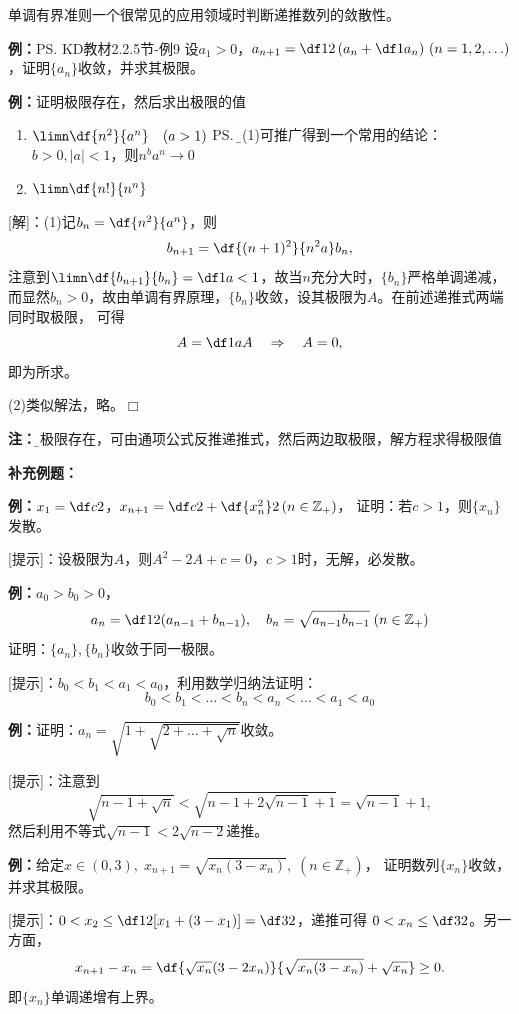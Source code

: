 单调有界准则一个很常见的应用领域时判断递推数列的敛散性。

{\bf 例：}\ps{KD教材2.2.5节-例9}
设$a_1>0$，$a_{n+1}=\df 12\left(a_n+\df 1{a_n}\right)\,
(n=1,2,\ldots)$，证明$\{a_n\}$收敛，并求其极限。

{\bf 例：}证明极限存在，然后求出极限的值
\begin{enumerate}[(1)]
  \setlength{\itemindent}{1cm}
  \item $\limn\df{n^2}{a^n}\quad (a>1)$%
  \ps{\b 由(1)可推广得到一个常用的结论：$b>0,|a|<1$，则$n^ba^n\to 0$}
  \item $\limn\df{n!}{n^n}$%
\end{enumerate}

[解]：(1)\;记$b_n=\df{n^2}{a^n}$，则
$$b_{n+1}=\df{(n+1)^2}{n^2a}b_n,$$
注意到$\limn\df{b_{n+1}}{b_n}=\df1a<1$，故当$n$充分大时，$\{b_n\}$严格单调递减，
而显然$b_n>0$，故由单调有界原理，$\{b_n\}$收敛，设其极限为$A$。在前述递推式两端同时取极限，
可得
$$A=\df1aA\quad\Rightarrow\quad A=0,$$
即为所求。

(2)\;类似解法，略。\hfill $\Box$

{\bf 注：}{\b 若极限存在，可由通项公式反推递推式，然后两边取极限，解方程求得极限值}

{\bf 补充例题：}

{\bf 例：}$x_1=\df c2$，$x_{n+1}=\df c2+\df{x_n^2}2\,(n\in\mathbb{Z}_+)$，
证明：若$c>1$，则$\{x_n\}$发散。

[提示]：设极限为$A$，则$A^2-2A+c=0$，$c>1$时，无解，必发散。

{\bf 例：}$a_0>b_0>0$，
$$a_n=\df12(a_{n-1}+b_{n-1}),\quad
b_n=\sqrt{a_{n-1}b_{n-1}}\;(n\in\mathbb{Z}_+)$$
证明：$\{a_n\},\{b_n\}$收敛于同一极限。

[提示]：$b_0<b_1<a_1<a_0$，利用数学归纳法证明：
$$b_0<b_1<\ldots<b_n<a_n<\ldots<a_1<a_0$$

{\bf 例：}证明：$a_n=\sqrt{1+\sqrt{2+\ldots+\sqrt{n}}}$收敛。

[提示]：注意到
$$\sqrt{n-1+\sqrt n}<\sqrt{n-1+2\sqrt{n-1}+1}=\sqrt{n-1}+1,$$
然后利用不等式$\sqrt{n-1}<2\sqrt{n-2}$递推。

{\bf 例：}给定$x\in(0,3),\; x_{n+1}=\sqrt{x_n(3-x_n)},\;(n\in\mathbb{Z}_+)$，
证明数列$\{x_n\}$收敛，并求其极限。

[提示]：$0<x_2\leq\df12[x_1+(3-x_1)]=\df32$，递推可得
$0<x_n\leq\df32$。另一方面，
$$x_{n+1}-x_n=\df{\sqrt{x_n}(3-2x_n)}{\sqrt{x_n(3-x_n)}+\sqrt{x_n}}\geq 0.$$
即$\{x_n\}$单调递增有上界。


